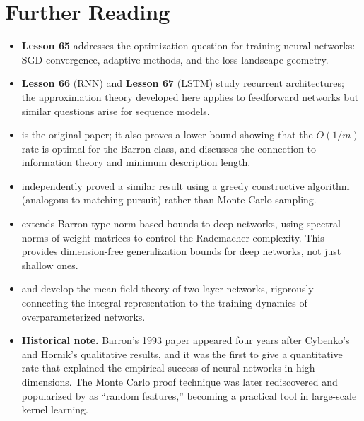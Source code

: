\documentclass[11pt,a4paper]{article}
\begin{document}
\section{Further Reading}
\label{sec:further-reading}

\begin{itemize}
  \item \textbf{Lesson 65} addresses the optimization question for
    training neural networks: SGD convergence, adaptive methods, and
    the loss landscape geometry.

  \item \textbf{Lesson 66} (RNN) and \textbf{Lesson 67} (LSTM) study
    recurrent architectures; the approximation theory developed here
    applies to feedforward networks but similar questions arise for
    sequence models.

  \item \citet{barron1993} is the original paper; it also proves a lower
    bound showing that the $O(1/m)$ rate is optimal for the Barron class,
    and discusses the connection to information theory and minimum
    description length.

  \item \citet{jones1992} independently proved a similar result using a
    greedy constructive algorithm (analogous to matching pursuit) rather
    than Monte Carlo sampling.

  \item \citet{bartlett2017} extends Barron-type norm-based bounds to
    deep networks, using spectral norms of weight matrices to control
    the Rademacher complexity.  This provides dimension-free
    generalization bounds for deep networks, not just shallow ones.

  \item \citet{chizat2018} and \citet{mei2018} develop the mean-field
    theory of two-layer networks, rigorously connecting the integral
    representation to the training dynamics of overparameterized networks.

  \item \textbf{Historical note.}  Barron's 1993 paper appeared four years
    after Cybenko's and Hornik's qualitative results, and it was the first
    to give a quantitative rate that explained the empirical success of
    neural networks in high dimensions.  The Monte Carlo proof technique
    was later rediscovered and popularized by \citet{rahimi2008} as
    ``random features,'' becoming a practical tool in large-scale kernel
    learning.
\end{itemize}


\end{document}
